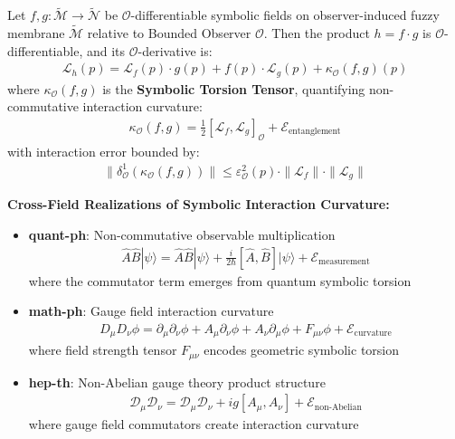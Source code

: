 \begin{theorem}
\label{theorem:bk4_fuzzy_product_rule}
Let $f, g: \tilde{\mathcal{M}} \rightarrow \tilde{\mathcal{N}}$ be $\mathcal{O}$-differentiable symbolic fields on observer-induced fuzzy membrane $\tilde{\mathcal{M}}$ relative to Bounded Observer $\mathcal{O}$. Then the product $h = f \cdot g$ is $\mathcal{O}$-differentiable, and its $\mathcal{O}$-derivative is:
\begin{align}
\mathcal{L}_h(p) = \mathcal{L}_f(p) \cdot g(p) + f(p) \cdot \mathcal{L}_g(p) + \kappa_{\mathcal{O}}(f, g)(p)
\end{align}
where $\kappa_{\mathcal{O}}(f, g)$ is the \textbf{Symbolic Torsion Tensor}, quantifying non-commutative interaction curvature:
\begin{align}
\kappa_{\mathcal{O}}(f, g) = \frac{1}{2}[\mathcal{L}_f, \mathcal{L}_g]_{\mathcal{O}} + \mathcal{E}_{\text{entanglement}}
\end{align}
with interaction error bounded by:
\begin{align}
\|\delta^1_{\mathcal{O}}(\kappa_{\mathcal{O}}(f, g))\| \leq \varepsilon_{\mathcal{O}}^2(p) \cdot \|\mathcal{L}_f\| \cdot \|\mathcal{L}_g\|
\end{align}

\textbf{Cross-Field Realizations of Symbolic Interaction Curvature:}

\begin{itemize}
\item \textbf{quant-ph}: Non-commutative observable multiplication
  \begin{align}
  \hat{A} \hat{B} |\psi\rangle = \hat{A}\hat{B} |\psi\rangle + \frac{i}{2\hbar}[\hat{A}, \hat{B}] |\psi\rangle + \mathcal{E}_{\text{measurement}}
  \end{align}
  where the commutator term emerges from quantum symbolic torsion
  
\item \textbf{math-ph}: Gauge field interaction curvature
  \begin{align}
  D_\mu D_\nu \phi = \partial_\mu \partial_\nu \phi + A_\mu \partial_\nu \phi + A_\nu \partial_\mu \phi + F_{\mu\nu} \phi + \mathcal{E}_{\text{curvature}}
  \end{align}
  where field strength tensor $F_{\mu\nu}$ encodes geometric symbolic torsion
  
\item \textbf{hep-th}: Non-Abelian gauge theory product structure
  \begin{align}
  \mathcal{D}_\mu \mathcal{D}_\nu = \mathcal{D}_\mu \mathcal{D}_\nu + ig[A_\mu, A_\nu] + \mathcal{E}_{\text{non-Abelian}}
  \end{align}
  where gauge field commutators create interaction curvature
  

\end{itemize}
\end{theorem}
